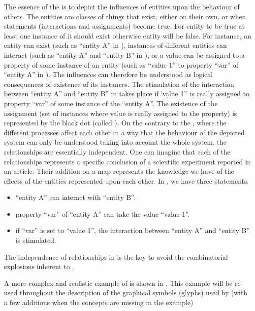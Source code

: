 The essence of the \ERs is to depict the influences of entities upon the behaviour of others. The entities are classes of things that exist, either on their own, or when statements (interactions and assignments) become true. For entity to be true at least one instance of it should exist otherwise entity will be false. For instance, an entity can exist (such as ``entity A'' in ), instances of different entities can interact (such as ``entity A'' and ``entity B'' in ), or a value can be assigned to a property of some instance of an entity (such as ``value 1'' to property ``var'' of ``entity A'' in ). The influences can therefore be understood as logical consequences of existence of its instances. The stimulation of the interaction between ``entity A'' and ``entity B'' in  takes place if `value 1'' is really assigned to property ``var'' of some instance of the ``entity A''. The existence of the assignment (set of instances where value is really assigned to the property) is represented by the black dot (called ). On the contrary to the \PDl, where the different processes affect each other in a way that the behaviour of the depicted system can only be understood taking into account the whole system, the relationships are essentially independent. One can imagine that each of the relationships represents a specific conclusion of a scientific experiment reported in an article. Their addition on a map represents the knowledge we have of the effects of the entities represented upon each other. In  , we have three statements: 

\begin{itemize}
 \item ``entity A'' can interact with ``entity B''.
 \item property ``var'' of ``entity A'' can take the value ``value 1''.
 \item if ``var'' is set to ``value 1'', the interaction between ``entity A'' and ``entity B'' is stimulated.
\end{itemize}


The independence of relationships in \ERs is the key to avoid the combinatorial explosions inherent to \PDs.

A more complex and realistic example of \ERm is shown in . This example will be re-used throughout the description of the graphical symbols (glyphs) used by \SBGNERLone (with a few additions when the concepts are missing in the example) 

